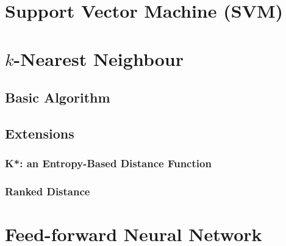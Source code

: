 \section{Support Vector Machine (SVM)}

\section{$k$-Nearest Neighbour}
\subsection{Basic Algorithm}

\subsection{Extensions}
\subsubsection{K*: an Entropy-Based Distance Function}

\subsubsection{Ranked Distance}

\section{Feed-forward Neural Network}

